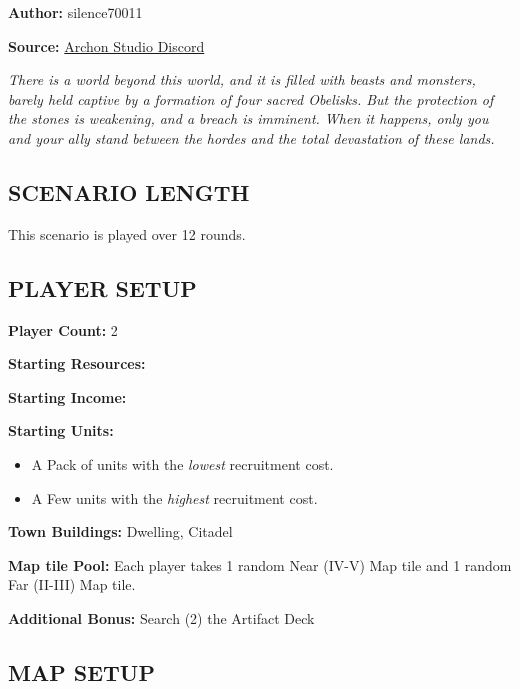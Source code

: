 
\begin{multicols*}{2}

\textbf{Author:} silence70011

\textbf{Source:} \href{https://discord.com/channels/740870068178649108/1233112440322002964/1233112440322002964}{Archon Studio Discord}

\textit{There is a world beyond this world, and it is filled with beasts and monsters, barely held captive by a formation of four sacred Obelisks.
  But the protection of the stones is weakening, and a breach is imminent.
  When it happens, only you and your ally stand between the hordes and the total devastation of these lands.
}

\subsection*{\MakeUppercase{Scenario Length}}

This scenario is played over 12 rounds.

\subsection*{\MakeUppercase{Player Setup}}

\textbf{Player Count:} 2

\textbf{Starting Resources:}\par
{}

\textbf{Starting Income:}\par
{}

\textbf{Starting Units:}
\begin{itemize}
  \item A Pack of  units with the \textit{lowest} recruitment cost.
  \item A Few  units with the \textit{highest} recruitment cost.
\end{itemize}

\textbf{Town Buildings:}  Dwelling, Citadel

\textbf{Map tile Pool:} Each player takes 1 random Near (IV-V) Map tile and 1 random Far (II-III) Map tile.

\textbf{Additional Bonus:} Search (2) the Artifact Deck

\subsection*{\MakeUppercase{Map Setup}}


\end{multicols*}
